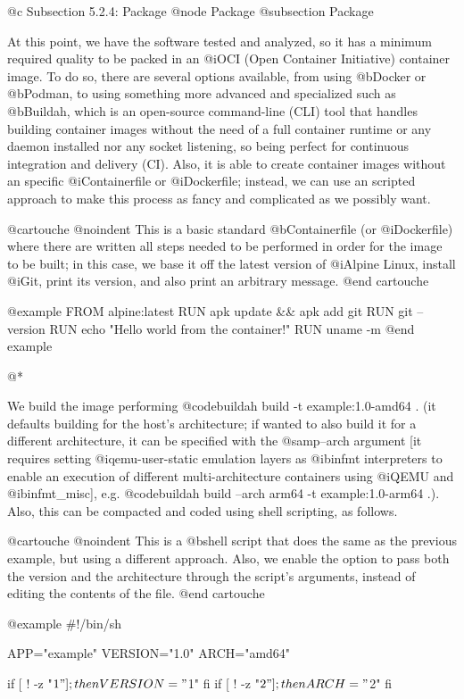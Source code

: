 @c Subsection 5.2.4: Package
@node Package
@subsection Package

At this point, we have the software tested and analyzed, so it has a minimum required quality to be packed in an @i{OCI (Open Container Initiative)} container image. To do so, there are several options available, from using @b{Docker} or @b{Podman}, to using something more advanced and specialized such as @b{Buildah}, which is an open-source command-line (CLI) tool that handles building container images without the need of a full container runtime or any daemon installed nor any socket listening, so being perfect for continuous integration and delivery (CI). Also, it is able to create container images without an specific @i{Containerfile} or @i{Dockerfile}; instead, we can use an scripted approach to make this process as fancy and complicated as we possibly want.

@cartouche
@noindent This is a basic standard @b{Containerfile} (or @i{Dockerfile}) where there are written all steps needed to be performed in order for the image to be built; in this case, we base it off the latest version of @i{Alpine Linux}, install @i{Git}, print its version, and also print an arbitrary message.
@end cartouche

@example
FROM alpine:latest
RUN apk update && apk add git
RUN git --version
RUN echo "Hello world from the container!"
RUN uname -m
@end example

@*

We build the image performing @code{buildah build -t example:1.0-amd64 .} (it defaults building for the host's architecture; if wanted to also build it for a different architecture, it can be specified with the @samp{--arch} argument [it requires setting @i{qemu-user-static} emulation layers as @i{binfmt interpreters} to enable an execution of different multi-architecture containers using @i{QEMU} and @i{binfmt_misc}], e.g. @code{buildah build --arch arm64 -t example:1.0-arm64 .}). Also, this can be compacted and coded using shell scripting, as follows.

@cartouche
@noindent This is a @b{shell script} that does the same as the previous example, but using a different approach. Also, we enable the option to pass both the version and the architecture through the script's arguments, instead of editing the contents of the file.
@end cartouche

@example
#!/bin/sh

APP="example"
VERSION="1.0"
ARCH="amd64"

if [ ! -z "$1" ]; then
  VERSION="$1"
fi
if [ ! -z "$2" ]; then
  ARCH="$2"
fi


